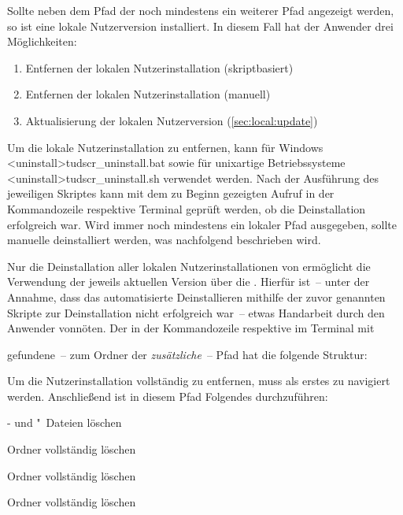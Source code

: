 Sollte neben dem Pfad der \Distro noch mindestens ein 
weiterer Pfad angezeigt werden, so ist eine lokale Nutzerversion installiert. 
In diesem Fall hat der Anwender drei Möglichkeiten:
%
\begin{enumerate}
\item Entfernen der lokalen Nutzerinstallation (skriptbasiert)
\item Entfernen der lokalen Nutzerinstallation (manuell)
\item Aktualisierung der lokalen Nutzerversion (\autoref{sec:local:update})
\end{enumerate}

Um die lokale Nutzerinstallation zu entfernen, kann für Windows
\GitHubDownload*<uninstall>{tudscr_uninstall.bat} sowie für unixartige 
Betriebssysteme \GitHubDownload*<uninstall>{tudscr_uninstall.sh} verwendet 
werden. Nach der Ausführung des jeweiligen Skriptes kann mit dem zu Beginn 
gezeigten Aufruf in der Kommandozeile respektive Terminal geprüft werden, ob 
die Deinstallation erfolgreich war. Wird immer noch mindestens ein lokaler Pfad 
ausgegeben, sollte \TUDScript manuelle deinstalliert werden, was nachfolgend 
beschrieben wird.

Nur die Deinstallation aller lokalen Nutzerinstallationen von \TUDScript 
ermöglicht die Verwendung der jeweils aktuellen Version über die 
\Distro. Hierfür ist~-- unter der Annahme, dass das 
automatisierte Deinstallieren mithilfe der zuvor genannten Skripte zur 
Deinstallation nicht erfolgreich war~-- etwas Handarbeit durch den Anwender 
vonnöten. Der in der Kommandozeile respektive im Terminal mit
%
\begin{quoting}
\RET
\end{quoting}
%
gefundene~-- zum Ordner der \Distro \emph{zusätzliche}~-- 
Pfad hat die folgende Struktur:
%
\begin{quoting}
\end{quoting}
%
Um die Nutzerinstallation vollständig zu entfernen, muss als erstes zu 
 navigiert werden. Anschließend ist in diesem 
Pfad Folgendes durchzuführen:
%
\settowidth{}%
\begin{description}[labelwidth=\tudscrdim,labelsep=1em]
\item[\Path{tex/latex/tudscr/}]- und "~Dateien löschen
\item[\Path{tex/latex/tudscr/}]Ordner  vollständig löschen
\item[\Path{doc/latex/}] Ordner  vollständig löschen
\item[\Path{source/latex/}] Ordner  vollständig löschen
\end{description}

